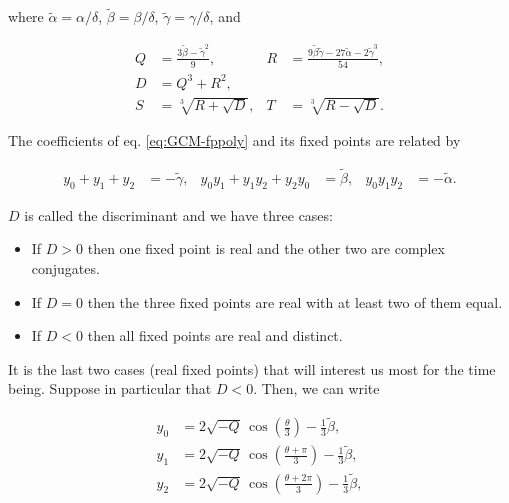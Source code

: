 \documentclass[10pt,twoside,titlepage]{book}
\numberwithin{equation}{chapter}
\numberwithin{figure}{chapter}
\numberwithin{table}{chapter}
\theoremstyle{plain}%
\theoremstyle{definition}
\theoremstyle{remark}
\begin{document}
where $\tilde{\alpha}=\alpha/\delta$, $\tilde{\beta}=\beta/\delta$, $\tilde{\gamma}=\gamma/\delta$, and

\begin{equation}
	\begin{aligned}
		Q&=\frac{3\tilde{\beta}-\tilde{\gamma}^2}{9}, & R&=\frac{9\tilde{\beta}\tilde{\gamma}-27\tilde{\alpha}-2\tilde{\gamma}^3}{54},\\
		D&=Q^3+R^2, & &\\
		S&=\sqrt[3]{R+\sqrt{D}}, &  T&=\sqrt[3]{R-\sqrt{D}}.
	\end{aligned}
\end{equation}

The coefficients of eq. \eqref{eq:GCM-fppoly} and its fixed points are related by

\begin{equation}
	\begin{aligned}
		y_0+y_1+y_2&=-\tilde{\gamma}, & y_0y_1+y_1y_2+y_2y_0&=\tilde{\beta}, & y_0y_1y_2&=-\tilde{\alpha}.
	\end{aligned}
\end{equation}

$D$ is called the discriminant and we have three cases:

\begin{itemize}
	\item If $D>0$ then one fixed point is real and the other two are complex conjugates.
	\item If $D=0$ then the three fixed points are real with at least two of them equal.
	\item If $D<0$ then all fixed points are real and distinct.
\end{itemize}

It is the last two cases (real fixed points) that will interest us most for the time being. Suppose in particular that $D<0$. Then, we can write \cite{MathHandbook}

\begin{equation}
	\begin{aligned}
		y_0 &= 2\sqrt{-Q}\,\cos\left(\frac{\theta}{3}\right)-\frac{1}{3}\tilde{\beta},\\
		y_1 &= 2\sqrt{-Q}\,\cos\left(\frac{\theta+\pi}{3}\right)-\frac{1}{3}\tilde{\beta},\\
		y_2 &= 2\sqrt{-Q}\,\cos\left(\frac{\theta+2\pi}{3}\right)-\frac{1}{3}\tilde{\beta},\\
	\end{aligned}
\end{equation}
\end{document}
